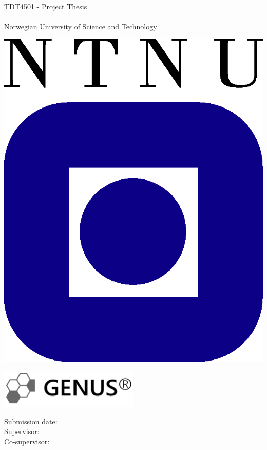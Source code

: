 \begin{titlepage}
\begin{center}

	{\Huge \thetitle} \\[0.4cm]


	{\Large TDT4501 - Project Thesis} \\[2.0cm]
	{\Large \theauthor} \\ [0.5cm]
	{\Large Norwegian University of Science and Technology}\\

	\vspace{2.0cm}

			\includegraphics{img/misc/ntnu-logo.png}

	\vspace{2.0cm}

			\includegraphics[width=0.5\textwidth]{img/genus.png}

	\vspace{2.0cm}

	{\Large Submission date: \thedate} \\[0.2cm]
	{\Large Supervisor: \supervisor} \\ [0.2cm]
	{\Large Co-supervisor: \coSupervisor} \\ [0.2cm]
	
\end{center}
\end{titlepage}
